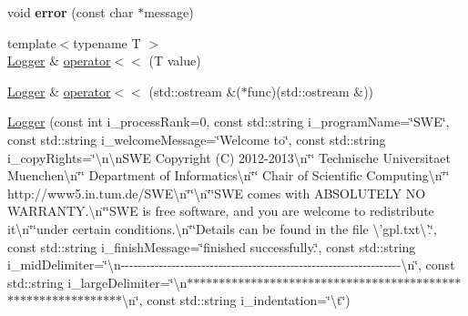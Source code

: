 \begin{DoxyCompactItemize}
\item 
\hypertarget{classtools_1_1Logger_a769bbaa6d8dcc4a10803107c01d1a42c}{void {\bfseries error} (const char $\ast$message)}\label{classtools_1_1Logger_a769bbaa6d8dcc4a10803107c01d1a42c}

\item 
{\footnotesize template$<$typename T $>$ }\\\hyperlink{classtools_1_1Logger}{Logger} \& \hyperlink{classtools_1_1Logger_a329a9574f28452d55118911d2ce428f8}{operator$<$$<$} (T value)
\item 
\hyperlink{classtools_1_1Logger}{Logger} \& \hyperlink{classtools_1_1Logger_aad70622a440e19c348291a46be9d0751}{operator$<$$<$} (std\-::ostream \&($\ast$func)(std\-::ostream \&))
\item 
\hyperlink{classtools_1_1Logger_a9e1e0651776fcc78f89a1a1dcf339249}{Logger} (const int i\-\_\-process\-Rank=0, const std\-::string i\-\_\-program\-Name=\char`\"{}S\-W\-E\char`\"{}, const std\-::string i\-\_\-welcome\-Message=\char`\"{}Welcome to\char`\"{}, const std\-::string i\-\_\-copy\-Rights=\char`\"{}\textbackslash{}n\textbackslash{}n\-S\-W\-E Copyright (C) 2012-\/2013\textbackslash{}n\char`\"{}\char`\"{}  Technische Universitaet Muenchen\textbackslash{}n\char`\"{}\char`\"{}  Department of Informatics\textbackslash{}n\char`\"{}\char`\"{}  Chair of Scientific Computing\textbackslash{}n\char`\"{}\char`\"{}  http\-://www5.\-in.\-tum.\-de/S\-W\-E\textbackslash{}n\char`\"{}\char`\"{}\textbackslash{}n\char`\"{}\char`\"{}S\-W\-E comes with A\-B\-S\-O\-L\-U\-T\-E\-L\-Y N\-O W\-A\-R\-R\-A\-N\-T\-Y.\textbackslash{}n\char`\"{}\char`\"{}S\-W\-E is free software, and you are welcome to redistribute it\textbackslash{}n\char`\"{}\char`\"{}under certain conditions.\textbackslash{}n\char`\"{}\char`\"{}Details can be found in the file \textbackslash{}'gpl.\-txt\textbackslash{}'.\char`\"{}, const std\-::string i\-\_\-finish\-Message=\char`\"{}finished successfully.\char`\"{}, const std\-::string i\-\_\-mid\-Delimiter=\char`\"{}\textbackslash{}n-\/-\/-\/-\/-\/-\/-\/-\/-\/-\/-\/-\/-\/-\/-\/-\/-\/-\/-\/-\/-\/-\/-\/-\/-\/-\/-\/-\/-\/-\/-\/-\/-\/-\/-\/-\/-\/-\/-\/-\/-\/-\/-\/-\/-\/-\/-\/-\/-\/-\/-\/-\/-\/-\/-\/-\/-\/-\/-\/-\/-\/-\/-\/-\/-\/-\/\textbackslash{}n\char`\"{}, const std\-::string i\-\_\-large\-Delimiter=\char`\"{}\textbackslash{}n$\ast$$\ast$$\ast$$\ast$$\ast$$\ast$$\ast$$\ast$$\ast$$\ast$$\ast$$\ast$$\ast$$\ast$$\ast$$\ast$$\ast$$\ast$$\ast$$\ast$$\ast$$\ast$$\ast$$\ast$$\ast$$\ast$$\ast$$\ast$$\ast$$\ast$$\ast$$\ast$$\ast$$\ast$$\ast$$\ast$$\ast$$\ast$$\ast$$\ast$$\ast$$\ast$$\ast$$\ast$$\ast$$\ast$$\ast$$\ast$$\ast$$\ast$$\ast$$\ast$$\ast$$\ast$$\ast$$\ast$$\ast$$\ast$$\ast$$\ast$$\ast$\textbackslash{}n\char`\"{}, const std\-::string i\-\_\-indentation=\char`\"{}\textbackslash{}t\char`\"{})

\end{DoxyCompactItemize}
